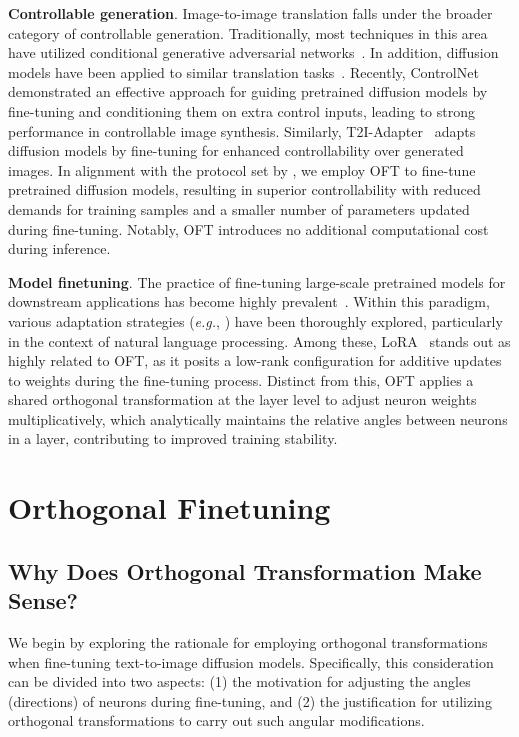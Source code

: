 \textbf{Controllable generation}. Image-to-image translation falls under the broader category of controllable generation. Traditionally, most techniques in this area have utilized conditional generative adversarial networks~\cite{isola2017image,zhu2017toward,wang2018high,park2019semantic,choi2018stargan}. In addition, diffusion models have been applied to similar translation tasks~\cite{saharia2022palette,voynov2022sketch,wang2022pretraining}. Recently, ControlNet~\cite{zhang2023adding} demonstrated an effective approach for guiding pretrained diffusion models by fine-tuning and conditioning them on extra control inputs, leading to strong performance in controllable image synthesis. Similarly, T2I-Adapter~\cite{mou2023t2i} adapts diffusion models by fine-tuning for enhanced controllability over generated images. In alignment with the protocol set by \cite{zhang2023adding,mou2023t2i}, we employ OFT to fine-tune pretrained diffusion models, resulting in superior controllability with reduced demands for training samples and a smaller number of parameters updated during fine-tuning. Notably, OFT introduces no additional computational cost during inference.

\textbf{Model finetuning}. The practice of fine-tuning large-scale pretrained models for downstream applications has become highly prevalent~\cite{devlin2018bert,brown2020language,he2022masked}. Within this paradigm, various adaptation strategies (\emph{e.g.}, \cite{hulora2022,houlsby2019parameter,pfeiffer2020adapterfusion}) have been thoroughly explored, particularly in the context of natural language processing. Among these, LoRA~\cite{hulora2022} stands out as highly related to OFT, as it posits a low-rank configuration for additive updates to weights during the fine-tuning process. Distinct from this, OFT applies a shared orthogonal transformation at the layer level to adjust neuron weights multiplicatively, which analytically maintains the relative angles between neurons in a layer, contributing to improved training stability.

\section{Orthogonal Finetuning}

\subsection{Why Does Orthogonal Transformation Make Sense?}

We begin by exploring the rationale for employing orthogonal transformations when fine-tuning text-to-image diffusion models. Specifically, this consideration can be divided into two aspects: (1) the motivation for adjusting the angles (directions) of neurons during fine-tuning, and (2) the justification for utilizing orthogonal transformations to carry out such angular modifications.

